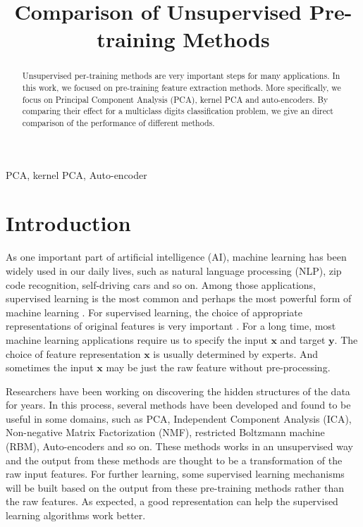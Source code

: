 \documentclass[tikz, multi,dvipsnames,svgnames,x11names]{article}
\title{Comparison of Unsupervised Pre-training Methods}
\begin{document}
\maketitle

\begin{abstract}
Unsupervised per-training methods are very important steps for many applications. In this work, we focused on pre-training feature extraction methods. More specifically, we focus on Principal Component Analysis (PCA), kernel PCA and auto-encoders. By comparing their effect for a multiclass digits classification problem, we give an direct comparison of the performance of different methods.
\end{abstract}

\begin{keywords}
PCA, kernel PCA, Auto-encoder
\end{keywords}

\section{Introduction}
\label{sec:intro}

As one important part of artificial intelligence (AI), machine learning has been widely used in our daily lives, such as natural language processing (NLP), zip code recognition, self-driving cars and so on. Among those applications, supervised learning is the most common and perhaps the most powerful form of machine learning \cite{lecun2015deep}. For supervised learning, the choice of appropriate representations of original features is very important \cite{bengio2012deep}. For a long time, most machine learning applications require us to specify the input $\bm{x}$ and target $\bm{y}$. The choice of feature representation $\bm{x}$ is usually determined by experts. And sometimes the input $\bm{x}$ may be just the raw feature without pre-processing. 

Researchers have been working on discovering the hidden structures of the data for years. In this process, several methods have been developed and found to be useful in some domains, such as PCA, Independent Component Analysis (ICA), Non-negative Matrix Factorization (NMF), restricted Boltzmann machine (RBM), Auto-encoders and so on. These methods works in an unsupervised way and the output from these methods are thought to be a transformation of the raw input features. For further learning, some supervised learning mechanisms will be built based on the output from these pre-training methods rather than the raw features. As expected, a good representation can help the supervised learning algorithms work better.
\end{document}
